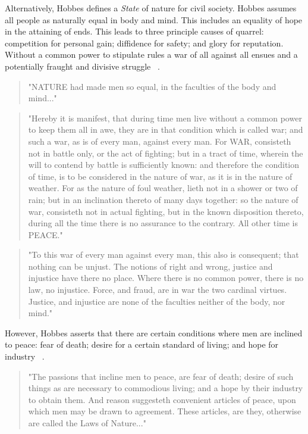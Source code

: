 \documentclass[11pt, oneside]{book}   	%
\begin{document}
Alternatively, Hobbes defines a \emph{State} of nature for civil society.
Hobbes assumes all people as naturally equal in body and mind.
This includes an equality of hope in the attaining of ends.
This leads to three principle causes of quarrel: competition for personal gain; diffidence for safety; and glory for reputation. Without a common power to stipulate rules a war of all against all ensues and a potentially fraught and divisive struggle ~\cite{th1}.

\begin{quote}
"NATURE had made men so equal, in the faculties of the body and mind..."
\end{quote}
\begin{quote}
"Hereby it is manifest, that during time men live without a common power to keep them all in awe, they are in that condition which is called war; and such a war, as is of every man, against every man. For WAR, consisteth not in battle only, or the act of fighting; but in a tract of time, wherein the will to contend by battle is sufficiently known: and therefore the condition of time, is to be considered in the nature of war, as it is in the nature of weather. For as the nature of foul weather, lieth not in a shower or two of rain; but in an inclination thereto of many days together: so the nature of war, consisteth not in actual fighting, but in the known disposition thereto, during all the time there is no assurance to the contrary. All other time is PEACE."
\end{quote}
\begin{quote}
"To this war of every man against every man, this also is consequent; that nothing can be unjust. The notions of right and wrong, justice and injustice have there no place. Where there is no common power, there is no law, no injustice. Force, and fraud, are in war the two cardinal virtues. Justice, and injustice are none of the faculties neither of the body, nor mind."
\end{quote}

However, Hobbes asserts that there are certain conditions where men are inclined to peace: fear of death; desire for a certain standard of living; and hope for industry ~\cite{th1}.

\begin{quote}
"The passions that incline men to peace, are fear of death; desire of such things as are necessary to commodious living; and a hope by their industry to obtain them. And reason suggesteth convenient articles of peace, upon which men may be drawn to agreement. These articles, are they, otherwise are called the Laws of Nature..."
\end{quote}
\end{document}
